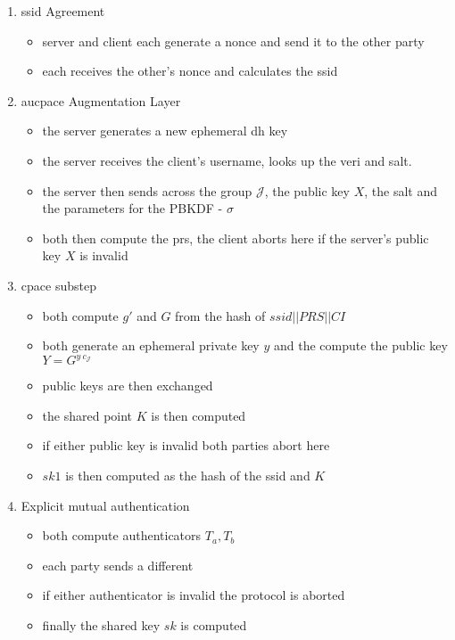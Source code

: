 \begin{enumerate}
  \item{
    \gls{ssid} Agreement
    \begin{itemize}
      \item{server and client each generate a \gls{nonce} and send it to the other party}
      \item{each receives the other's \gls{nonce} and calculates the \gls{ssid}}
    \end{itemize}
  }
  \item{
    \gls{aucpace} Augmentation Layer
    \begin{itemize}
      \item{the server generates a new ephemeral \gls{dh} key}
      \item{the server receives the client's username, looks up the \gls{veri} and salt.}
      \item{the server then sends across the group $\mathcal{J}$, the public key $X$, the salt and the parameters for the PBKDF - $\sigma$}
      \item{both then compute the \gls{prs}, the client aborts here if the server's public key $X$ is invalid}
    \end{itemize}
  }
  \item{
    \gls{cpace} substep
    \begin{itemize}
      \item{both compute $g'$ and $G$ from the hash of $ssid||PRS||CI$}
      \item{both generate an ephemeral private key $y$ and the compute the public key $Y = G^{y\ c_{\mathcal{J}}}$}
      \item{public keys are then exchanged}
      \item{the shared point $K$ is then computed}
      \item{if either public key is invalid both parties abort here}
      \item{$sk1$ is then computed as the hash of the \gls{ssid} and $K$}
    \end{itemize}
  }
  \item{
    Explicit mutual authentication
    \begin{itemize}
      \item{both compute authenticators $T_a, T_b$}
      \item{each party sends a different}
      \item{if either authenticator is invalid the protocol is aborted}
      \item{finally the shared key $sk$ is computed}
    \end{itemize}
  }
\end{enumerate}

